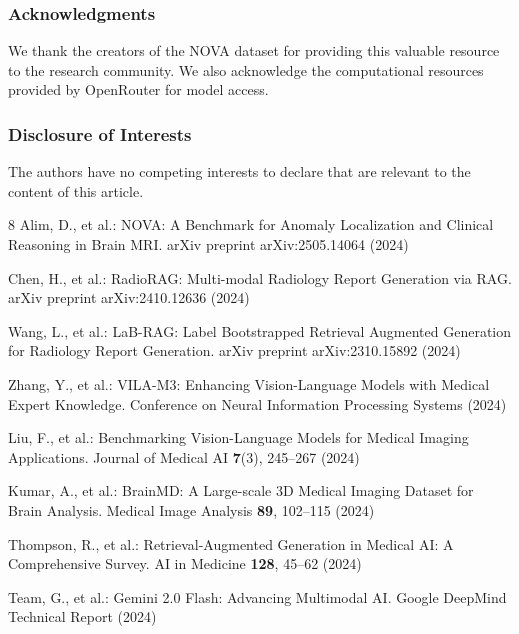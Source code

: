 \documentclass[runningheads]{llncs}
\begin{document}
\begin{credits}
\subsubsection{Acknowledgments}
We thank the creators of the NOVA dataset for providing this valuable resource to the research community. We also acknowledge the computational resources provided by OpenRouter for model access.

\subsubsection{Disclosure of Interests}
The authors have no competing interests to declare that are relevant to the content of this article.
\end{credits}

\begin{thebibliography}{8}
Alim, D., et al.: NOVA: A Benchmark for Anomaly Localization and Clinical Reasoning in Brain MRI. arXiv preprint arXiv:2505.14064 (2024)

Chen, H., et al.: RadioRAG: Multi-modal Radiology Report Generation via RAG. arXiv preprint arXiv:2410.12636 (2024)

Wang, L., et al.: LaB-RAG: Label Bootstrapped Retrieval Augmented Generation for Radiology Report Generation. arXiv preprint arXiv:2310.15892 (2024)

Zhang, Y., et al.: VILA-M3: Enhancing Vision-Language Models with Medical Expert Knowledge. Conference on Neural Information Processing Systems (2024)

Liu, F., et al.: Benchmarking Vision-Language Models for Medical Imaging Applications. Journal of Medical AI \textbf{7}(3), 245--267 (2024)

Kumar, A., et al.: BrainMD: A Large-scale 3D Medical Imaging Dataset for Brain Analysis. Medical Image Analysis \textbf{89}, 102--115 (2024)

Thompson, R., et al.: Retrieval-Augmented Generation in Medical AI: A Comprehensive Survey. AI in Medicine \textbf{128}, 45--62 (2024)

Team, G., et al.: Gemini 2.0 Flash: Advancing Multimodal AI. Google DeepMind Technical Report (2024)
\end{thebibliography}
\end{document}

